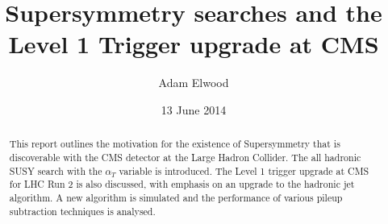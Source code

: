 

\title{Supersymmetry searches and the Level 1 Trigger upgrade at CMS}
\date{13 June 2014}
\author{Adam Elwood}

\maketitle        
        
\begin{abstract}
  \noindent
 This report outlines the motivation for the existence of Supersymmetry that is discoverable with the CMS detector at the Large Hadron Collider. The all hadronic SUSY search with the $\alpha_T$ variable is introduced. The Level 1 trigger upgrade at CMS for LHC Run 2 is also discussed, with emphasis on an upgrade to the hadronic jet algorithm. A new algorithm is simulated and the performance of various pileup subtraction techniques is analysed.
\end{abstract}












